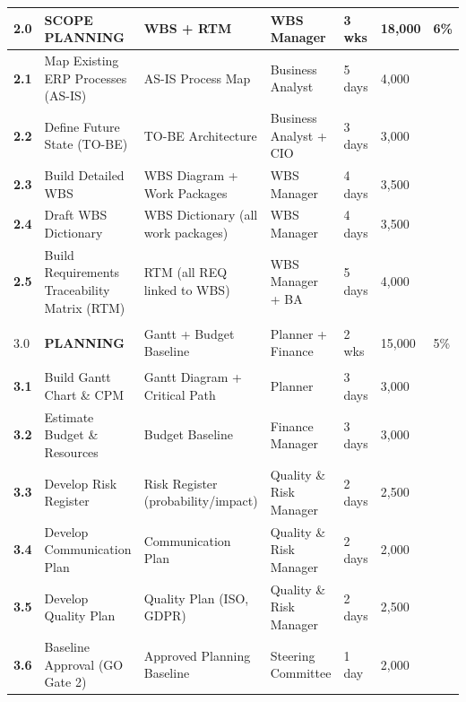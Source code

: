 \begin{longtable}{|>{\bfseries}p{1.1cm}|p{3.4cm}|p{3.1cm}|p{2.2cm}|p{1.0cm}|p{1.4cm}|p{0.8cm}|}
    \rowcolor{tableheader}
    2.0 & \textbf{SCOPE PLANNING} & WBS + RTM & WBS Manager & 3 wks & 18{,}000 & 6\% \\
    \hline
    2.1 & Map Existing ERP Processes (AS-IS) & AS-IS Process Map & Business Analyst & 5 days & 4{,}000 & \\
    \hline
    2.2 & Define Future State (TO-BE) & TO-BE Architecture & Business Analyst + CIO & 3 days & 3{,}000 & \\
    \hline
    2.3 & Build Detailed WBS & WBS Diagram + Work Packages & WBS Manager & 4 days & 3{,}500 & \\
    \hline
    2.4 & Draft WBS Dictionary & WBS Dictionary (all work packages) & WBS Manager & 4 days & 3{,}500 & \\
    \hline
    2.5 & Build Requirements Traceability Matrix (RTM) & RTM (all REQ linked to WBS) & WBS Manager + BA & 5 days & 4{,}000 & \\
    \hline

    \rowcolor{tableheader}
    3.0 & \textbf{PLANNING} & Gantt + Budget Baseline & Planner + Finance & 2 wks & 15{,}000 & 5\% \\
    \hline
    3.1 & Build Gantt Chart \& CPM & Gantt Diagram + Critical Path & Planner & 3 days & 3{,}000 & \\
    \hline
    3.2 & Estimate Budget \& Resources & Budget Baseline & Finance Manager & 3 days & 3{,}000 & \\
    \hline
    3.3 & Develop Risk Register & Risk Register (probability/impact) & Quality \& Risk Manager & 2 days & 2{,}500 & \\
    \hline
    3.4 & Develop Communication Plan & Communication Plan & Quality \& Risk Manager & 2 days & 2{,}000 & \\
    \hline
    3.5 & Develop Quality Plan & Quality Plan (ISO, GDPR) & Quality \& Risk Manager & 2 days & 2{,}500 & \\
    \hline
    3.6 & Baseline Approval (GO Gate 2) & Approved Planning Baseline & Steering Committee & 1 day & 2{,}000 & \\
    \hline


\end{longtable}
